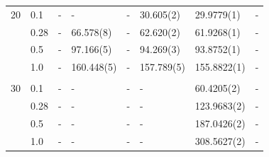 \begin{table} [H]
\begin{tabularx}{\textwidth}{l:l|XXXXXX}
		20 & 0.1 & - & - & - & 30.605(2) & 29.9779(1) & - \\ 
		& 0.28 & - & 66.578(8) & - & 62.620(2) & 61.9268(1) & - \\
		& 0.5 & - & 97.166(5) & - & 94.269(3) & 93.8752(1) & - \\
		& 1.0 & - & 160.448(5) & - & 157.789(5) & 155.8822(1) & - \\ \hdashline \\
		
		30 & 0.1 & - & - & - & - & 60.4205(2) & -\\ 
		& 0.28 & - & - & - & - & 123.9683(2) & - \\
		& 0.5 & - & - & - & - & 187.0426(2) & -\\
		& 1.0 & - & - & - & - & 308.5627(2) & -\\ \hline\hline
	\end{tabularx}
\end{table}


